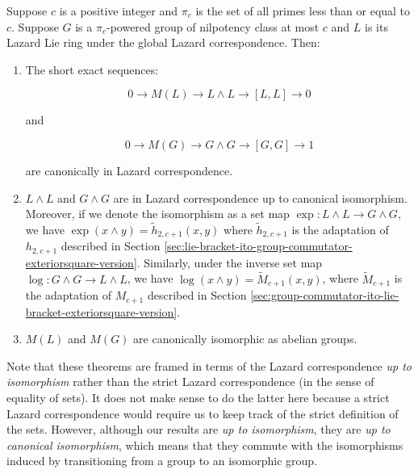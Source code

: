 \documentclass{ucetd}
\begin{document}
\begin{theorem}\label{thm:global-lazard-correspondence-preserves-schur-multipliers}
  Suppose $c$ is a positive integer and $\pi_c$ is the set of all primes
  less than or equal to $c$. Suppose $G$ is a $\pi_c$-powered group of
  nilpotency class at most $c$ and $L$ is its Lazard Lie ring under
  the global Lazard correspondence. Then:

  \begin{enumerate}
  \item The short exact sequences:

    $$0 \to M(L) \to L \wedge L \to [L,L] \to 0$$

    and

    $$0 \to M(G) \to G \wedge G \to [G,G] \to 1$$

    are canonically in Lazard correspondence.

  \item $L \wedge L$ and $G \wedge G$ are in Lazard correspondence up
    to canonical isomorphism. Moreover, if we denote the isomorphism
    as a set map $\exp: L \wedge L \to G \wedge G$, we have $\exp(x
    \wedge y) = \tilde{h}_{2,c+1}(x,y)$ where $\tilde{h}_{2,c+1}$ is
    the adaptation of $h_{2,c+1}$ described in Section
    \ref{sec:lie-bracket-ito-group-commutator-exteriorsquare-version}. Similarly,
    under the inverse set map $\log: G \wedge G \to L \wedge L$, we
    have $\log(x \wedge y) = \tilde{M}_{c+1}(x,y)$, where
    $\tilde{M}_{c+1}$ is the adaptation of $M_{c+1}$ described in
    Section
    \ref{sec:group-commutator-ito-lie-bracket-exteriorsquare-version}.
  \item $M(L)$ and $M(G)$ are canonically isomorphic as abelian groups.
  \end{enumerate}
\end{theorem}

Note that these theorems are framed in terms of the Lazard
correspondence {\em up to isomorphism} rather than the strict Lazard
correspondence (in the sense of equality of sets). It does not make
sense to do the latter here because a strict Lazard correspondence
would require us to keep track of the strict definition of the
sets. However, although our results are {\em up to isomorphism}, they
are {\em up to canonical isomorphism}, which means that they commute
with the isomorphisms induced by transitioning from a group to an
isomorphic group.
\end{document}

